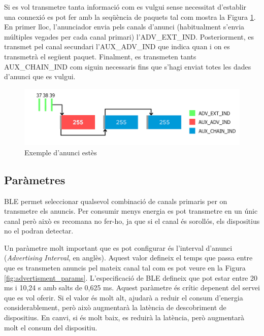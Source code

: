 Si es vol transmetre tanta informació com es vulgui sense necessitat d'establir una connexió es pot fer amb la seqüència de paquets tal com mostra la Figura \ref{fig:aux_chain_ind}.
En primer lloc, l'anunciador envia pels canals d'anunci (habitualment s'envia múltiples vegades per cada canal primari) l'ADV\_EXT\_IND.
Posteriorment, es transmet pel canal secundari l'AUX\_ADV\_IND que indica quan i on es transmetrà el següent paquet.
Finalment, es transmeten tants AUX\_CHAIN\_IND com siguin necessaris fins que s'hagi enviat totes les dades d'anunci que es vulgui.

\begin{figure}[h!]
	\begin{center}
		\includegraphics[width=1\textwidth]{./images/aux_chain_ind.png}
		\caption{Exemple d'anunci estès \cite{adv_ext}}
		\label{fig:aux_chain_ind}
	\end{center}
\end{figure}



\subsection{Paràmetres}
BLE permet seleccionar qualsevol combinació de canals primaris per on transmetre els anuncis.
Per consumir menys energia es pot transmetre en un únic canal però això es recomana no fer-ho, ja que si el canal és sorollós, els dispositius no el podran detectar.

Un paràmetre molt important que es pot configurar és l'interval d'anunci (\textit{Advertising Interval}, en anglès).
Aquest valor defineix el temps que passa entre que es transmeten anuncis pel mateix canal tal com es pot veure en la Figura \ref{fig:advertisment_params}.
L'especificació de BLE defineix que pot estar entre 20 ms i 10,24 s amb salts de 0,625 ms.
Aquest paràmetre és crític depenent del servei que es vol oferir.
Si el valor és molt alt, ajudarà a reduir el consum d'energia considerablement, però això augmentarà la latència de descobriment de dispositius.
En canvi, si és molt baix, es reduirà la latència, però augmentarà molt el consum del dispositiu.

